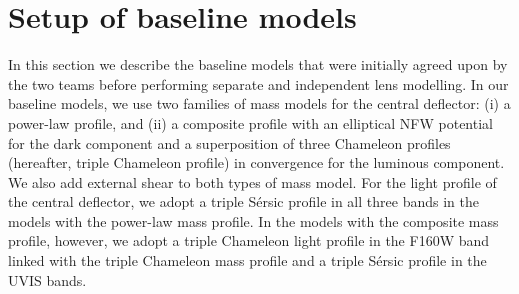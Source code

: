 \documentclass[longauth]{aa}
\newcommand{\ajs}[1]{{{#1}}}
\newcommand{\lreply}[1]{{{#1}}}
\begin{document}
\section{Setup of baseline models} \label{sec:baseline_models}

In this section we describe the baseline models that were initially agreed upon by the two teams before performing separate and independent lens modelling. \lreply{In our baseline models, we use two families of mass models for the central deflector: (i) a power-law profile, and (ii) a composite profile with an elliptical NFW potential for the dark component and a \ajs{superposition of three Chameleon profiles (hereafter, triple Chameleon profile) in convergence} for the luminous component. We also add external shear to both types of mass model. For the light profile of the central deflector, we adopt a triple S\'ersic profile in all three bands in the models with the power-law mass profile. In the models with the composite mass profile, however, we adopt a triple Chameleon light profile in the F160W band linked with the triple Chameleon mass profile and a triple S\'ersic profile in the UVIS bands.}

%
\end{document}
